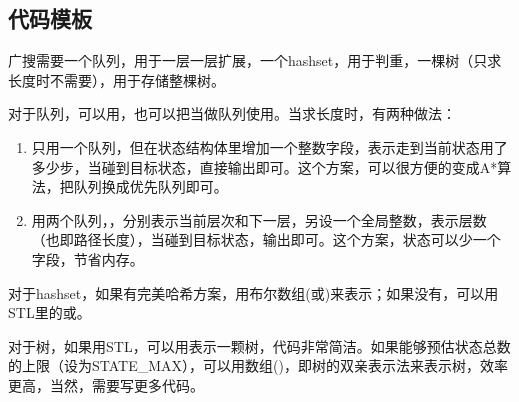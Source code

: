 \subsection{代码模板}
广搜需要一个队列，用于一层一层扩展，一个hashset，用于判重，一棵树（只求长度时不需要），用于存储整棵树。

对于队列，可以用，也可以把当做队列使用。当求长度时，有两种做法：
\begin{enumerate}
\item 只用一个队列，但在状态结构体里增加一个整数字段，表示走到当前状态用了多少步，当碰到目标状态，直接输出即可。这个方案，可以很方便的变成A*算法，把队列换成优先队列即可。
\item 用两个队列，，分别表示当前层次和下一层，另设一个全局整数，表示层数（也即路径长度），当碰到目标状态，输出即可。这个方案，状态可以少一个字段，节省内存。
\end{enumerate}

对于hashset，如果有完美哈希方案，用布尔数组(或)来表示；如果没有，可以用STL里的或。

对于树，如果用STL，可以用表示一颗树，代码非常简洁。如果能够预估状态总数的上限（设为STATE_MAX），可以用数组()，即树的双亲表示法来表示树，效率更高，当然，需要写更多代码。


